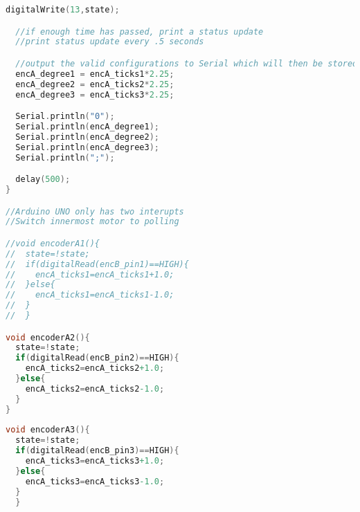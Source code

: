 \begin{lstlisting}[language=C]
  digitalWrite(13,state);

  //if enough time has passed, print a status update
  //print status update every .5 seconds

  //output the valid configurations to Serial which will then be stored in a file
  encA_degree1 = encA_ticks1*2.25;
  encA_degree2 = encA_ticks2*2.25;
  encA_degree3 = encA_ticks3*2.25;

  Serial.println("0");
  Serial.println(encA_degree1);
  Serial.println(encA_degree2);
  Serial.println(encA_degree3);
  Serial.println(";");

  delay(500);
}

//Arduino UNO only has two interupts
//Switch innermost motor to polling

//void encoderA1(){
//  state=!state;
//  if(digitalRead(encB_pin1)==HIGH){
//    encA_ticks1=encA_ticks1+1.0;
//  }else{
//    encA_ticks1=encA_ticks1-1.0;
//  }
//  }

void encoderA2(){
  state=!state;
  if(digitalRead(encB_pin2)==HIGH){
    encA_ticks2=encA_ticks2+1.0;
  }else{
    encA_ticks2=encA_ticks2-1.0;
  }
}
  
void encoderA3(){
  state=!state;
  if(digitalRead(encB_pin3)==HIGH){
    encA_ticks3=encA_ticks3+1.0;
  }else{
    encA_ticks3=encA_ticks3-1.0;
  }
  }

\end{lstlisting}
